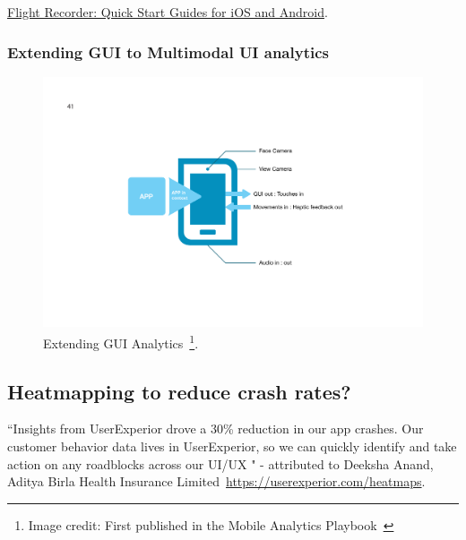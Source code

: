 \href{https://web.archive.org/web/20151104224311/http://help.flightrecorder.co/quick-start/}{Flight Recorder: Quick Start Guides for iOS and Android}.



\subsubsection{Extending GUI to Multimodal UI analytics}

\begin{figure}[htbp!]
    \begin{minipage}{\textwidth}
    \centering
    \includegraphics[width=15cm]{images/mobile-analytics-playbook/Chart-11-extending-gui-analytics.png}
    \caption[Extending GUI Analytics]{Extending GUI Analytics~\footnote{Image credit: First published in the Mobile Analytics Playbook~\cite{harty_aymer_playbook_2016}}.}
    \label{fig:extending-gui-analytics}
    \end{minipage}
\end{figure}

\subsection{Heatmapping to reduce crash rates?}
``Insights from UserExperior drove a 30\% reduction in our app crashes. Our customer behavior data lives in UserExperior, so we can quickly identify and take action on any roadblocks across our UI/UX " - attributed to Deeksha Anand, Aditya Birla Health Insurance Limited~\url{https://userexperior.com/heatmaps}. 

